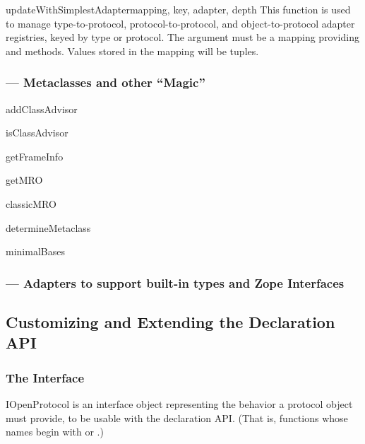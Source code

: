 \begin{verbatim%
}
\begin{verbatim%
}
\begin{verbatim%
}
\begin{verbatim%
}
\begin{funcdesc}{updateWithSimplestAdapter}{mapping, key, adapter, depth}
This function is used to manage type-to-protocol, protocol-to-protocol, and
object-to-protocol adapter registries, keyed by type or protocol.  The
 argument must be a mapping providing 
and  methods.  Values stored in the mapping will be
 tuples.
\end{funcdesc}






\subsubsection{ --- Metaclasses and other ``Magic''}
addClassAdvisor

isClassAdvisor

getFrameInfo

getMRO

classicMRO

determineMetaclass

minimalBases


\subsubsection{ --- Adapters to support built-in types
and Zope Interfaces}





















\subsection{Customizing and Extending the Declaration API\label{customizing-adaptation}}


\subsubsection{The  Interface \label{open-protocols}}

\begin{classdesc*}{IOpenProtocol}
 is an interface object representing the behavior a
protocol object must provide, to be usable with the 
declaration API.  (That is, functions whose names begin with 
or .)


\end{classdesc*}
\end{verbatim%
}
\end{verbatim%
}
\end{verbatim%
}
\end{verbatim%
}
